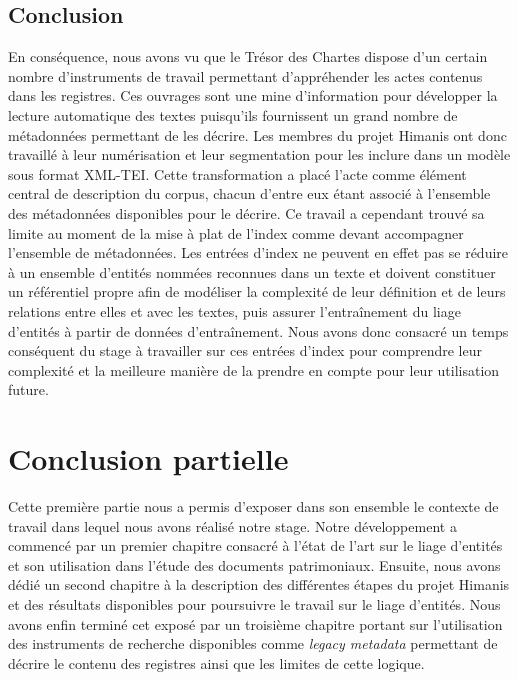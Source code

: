 \documentclass[a4paper,12pt,twoside]{book}
\begin{document}
	\section*{Conclusion}
	
	En conséquence, nous avons vu que le Trésor des Chartes dispose d'un certain nombre d'instruments de travail permettant d'appréhender les actes contenus dans les registres. Ces ouvrages sont une mine d'information pour développer la lecture automatique des textes puisqu'ils fournissent un grand nombre de métadonnées permettant de les décrire. Les membres du projet Himanis ont donc travaillé à leur numérisation et leur segmentation pour les inclure dans un modèle sous format XML-TEI. Cette transformation a placé l'acte comme élément central de description du corpus, chacun d'entre eux étant associé à l'ensemble des métadonnées disponibles pour le décrire. Ce travail a cependant trouvé sa limite au moment de la mise à plat de l'index comme devant accompagner l'ensemble de métadonnées. Les entrées d'index ne peuvent en effet pas se réduire à un ensemble d'entités nommées reconnues dans un texte et doivent constituer un référentiel propre afin de modéliser la complexité de leur définition et de leurs relations entre elles et avec les textes, puis assurer l'entraînement du liage d'entités à partir de données d'entraînement. Nous avons donc consacré un temps conséquent du stage à travailler sur ces entrées d'index pour comprendre leur complexité et la meilleure manière de la prendre en compte pour leur utilisation future.
	
	\chapter*{Conclusion partielle}
	
	Cette première partie nous a permis d'exposer dans son ensemble le contexte de travail dans lequel nous avons réalisé notre stage. Notre développement a commencé par un premier chapitre consacré à l'état de l'art sur le liage d'entités et son utilisation dans l'étude des documents patrimoniaux. Ensuite, nous avons dédié un second chapitre à la description des différentes étapes du projet Himanis et des résultats disponibles pour poursuivre le travail sur le liage d'entités. Nous avons enfin terminé cet exposé par un troisième chapitre portant sur l'utilisation des instruments de recherche disponibles comme \textit{legacy metadata} permettant de décrire le contenu des registres ainsi que les limites de cette logique.
	
\end{document}
